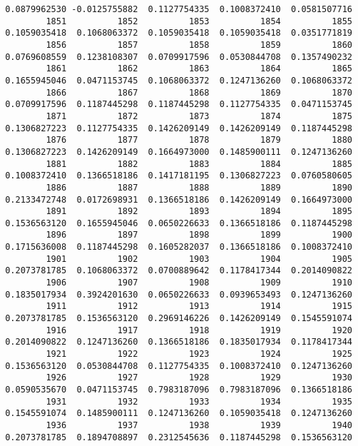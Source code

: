 \documentclass[
  letterpaper,
  DIV=11,
  numbers=noendperiod]{scrreprt}
\begin{document}
\begin{verbatim}
 0.0879962530 -0.0125755882  0.1127754335  0.1008372410  0.0581507716 
         1851          1852          1853          1854          1855 
 0.1059035418  0.1068063372  0.1059035418  0.1059035418  0.0351771819 
         1856          1857          1858          1859          1860 
 0.0769608559  0.1238108307  0.0709917596  0.0530844708  0.1357490232 
         1861          1862          1863          1864          1865 
 0.1655945046  0.0471153745  0.1068063372  0.1247136260  0.1068063372 
         1866          1867          1868          1869          1870 
 0.0709917596  0.1187445298  0.1187445298  0.1127754335  0.0471153745 
         1871          1872          1873          1874          1875 
 0.1306827223  0.1127754335  0.1426209149  0.1426209149  0.1187445298 
         1876          1877          1878          1879          1880 
 0.1306827223  0.1426209149  0.1664973000  0.1485900111  0.1247136260 
         1881          1882          1883          1884          1885 
 0.1008372410  0.1366518186  0.1417181195  0.1306827223  0.0760580605 
         1886          1887          1888          1889          1890 
 0.2133472748  0.0172698931  0.1366518186  0.1426209149  0.1664973000 
         1891          1892          1893          1894          1895 
 0.1536563120  0.1655945046  0.0650226633  0.1366518186  0.1187445298 
         1896          1897          1898          1899          1900 
 0.1715636008  0.1187445298  0.1605282037  0.1366518186  0.1008372410 
         1901          1902          1903          1904          1905 
 0.2073781785  0.1068063372  0.0700889642  0.1178417344  0.2014090822 
         1906          1907          1908          1909          1910 
 0.1835017934  0.3924201630  0.0650226633  0.0939653493  0.1247136260 
         1911          1912          1913          1914          1915 
 0.2073781785  0.1536563120  0.2969146226  0.1426209149  0.1545591074 
         1916          1917          1918          1919          1920 
 0.2014090822  0.1247136260  0.1366518186  0.1835017934  0.1178417344 
         1921          1922          1923          1924          1925 
 0.1536563120  0.0530844708  0.1127754335  0.1008372410  0.1247136260 
         1926          1927          1928          1929          1930 
 0.0590535670  0.0471153745  0.7983187096  0.7983187096  0.1366518186 
         1931          1932          1933          1934          1935 
 0.1545591074  0.1485900111  0.1247136260  0.1059035418  0.1247136260 
         1936          1937          1938          1939          1940 
 0.2073781785  0.1894708897  0.2312545636  0.1187445298  0.1536563120 

\end{verbatim}
\end{document}
